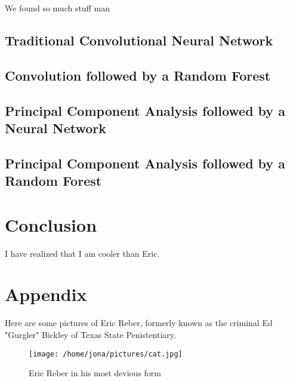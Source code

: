 \documentclass[onecolumn,10pt,cleanfoot]{asme2ej}
\begin{document}
We found so much stuff man

\subsection{Traditional Convolutional Neural Network}

\subsection{Convolution followed by a Random Forest}

\subsection{Principal Component Analysis followed by a Neural Network}

\subsection{Principal Component Analysis followed by a Random Forest}

\section{Conclusion}

I have realized that I am cooler than Eric.




\section*{Appendix}

Here are some pictures of Eric Reber, formerly known as the criminal Ed "Gurgler" Bickley of Texas State Penistentiary.


\begin{figure}[h]
\centerline{\texttt{[image: /home/jona/pictures/cat.jpg]}}
\caption{Eric Reber in his most devious form}
\label{real1msetraintest}
\end{figure}
\end{document}
